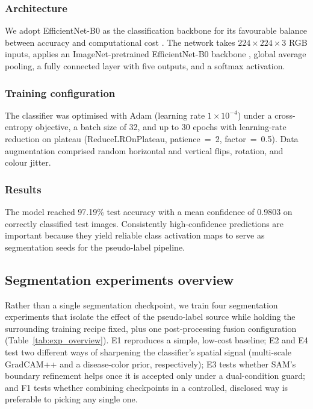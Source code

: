 \documentclass[final,5p,times,twocolumn,authoryear]{elsarticle}
\begin{document}
\subsubsection{Architecture}

We adopt EfficientNet-B0 as the classification backbone for its favourable balance between accuracy and computational cost \citep{tan2019efficientnet}. The network takes $224\times224\times3$ RGB inputs, applies an ImageNet-pretrained EfficientNet-B0 backbone \citep{deng2009imagenet}, global average pooling, a fully connected layer with five outputs, and a softmax activation.

\subsubsection{Training configuration}

The classifier was optimised with Adam (learning rate $1\times10^{-4}$) under a cross-entropy objective, a batch size of 32, and up to 30 epochs with learning-rate reduction on plateau (ReduceLROnPlateau, patience~=~2, factor~=~0.5). Data augmentation comprised random horizontal and vertical flips, rotation, and colour jitter.

\subsubsection{Results}

The model reached 97.19\% test accuracy with a mean confidence of 0.9803 on correctly classified test images. Consistently high-confidence predictions are important because they yield reliable class activation maps to serve as segmentation seeds for the pseudo-label pipeline.

\subsection{Segmentation experiments overview}
\label{sec:seg_overview}

Rather than a single segmentation checkpoint, we train four segmentation experiments that isolate the effect of the pseudo-label source while holding the surrounding training recipe fixed, plus one post-processing fusion configuration (Table~\ref{tab:exp_overview}). E1 reproduces a simple, low-cost baseline; E2 and E4 test two different ways of sharpening the classifier's spatial signal (multi-scale GradCAM++ and a disease-color prior, respectively); E3 tests whether SAM's boundary refinement helps once it is accepted only under a dual-condition guard; and F1 tests whether combining checkpoints in a controlled, disclosed way is preferable to picking any single one.
\end{document}
